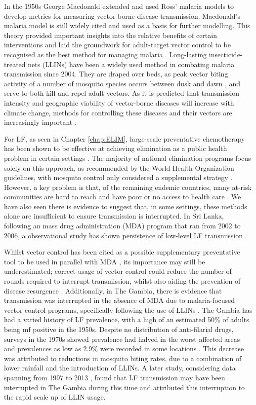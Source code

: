 In the 1950s George Macdonald extended and used Ross' malaria models to develop metrics for measuring vector-borne disease transmission. Macdonald's malaria model \cite{Macdonald1957} is still widely cited and used as a basis for further modelling. This theory provided important insights into the relative benefits of certain interventions and laid the groundwork for adult-target vector control to be recognised as the best method for managing malaria \cite{Dye1992,Morrison2008}. Long-lasting insecticide-treated nets (LLINs) have been a widely used method in combating malaria transmission since 2004. They are draped over beds, as peak vector biting activity of a number of mosquito species occurs between dusk and dawn \cite{korgaonkar2012}, and serve to both kill and repel adult vectors. As it is predicted that transmission intensity and geographic viability of vector-borne diseases will increase with climate change, methods for controlling these diseases and their vectors are increasingly important \cite{Watson2005}.

For LF, as seen in Chapter \ref{chap:ELIM}, large-scale preventative chemotherapy has been shown to be effective at achieving elimination as a public health problem in certain settings \cite{de2013,cheun2009}. The majority of national elimination programs focus solely on this approach, as recommended by the World Health Organization guidelines, with mosquito control only considered a supplemental strategy \cite{WHO2019_FactSheet}. However, a key problem is that, of the remaining endemic countries, many at-risk communities are hard to reach and have poor or no access to health care \cite{koudou2014}. We have also seen there is evidence to suggest that, in some settings, these methods alone are insufficient to ensure transmission is interrupted. In Sri Lanka, following an mass drug administration (MDA) program that ran from 2002 to 2006, a observational study has shown persistence of low-level LF transmission \cite{rao2014}.

Whilst vector control has been cited as a possible supplementary preventative tool to be used in parallel with MDA \cite{WHO2019_FactSheet}, its importance may still be underestimated; correct usage of vector control could reduce the number of rounds required to interrupt transmission, whilst also aiding the prevention of disease resurgence \cite{bockarie2009}. Additionally, in The Gambia, there is evidence that transmission was interrupted in the absence of MDA due to malaria-focused vector control programs, specifically following the use of LLINs \cite{rebollo2015}. The Gambia has had a varied history of LF prevalence, with a high of an estimated 50\% of adults being mf positive in the 1950s. Despite no distribution of anti-filarial drugs, surveys in the 1970s showed prevalence had halved in the worst affected areas and prevalences as low as 2.9\% were recorded in some locations \cite{knight1980}. This decrease was attributed to reductions in mosquito biting rates, due to a combination of lower rainfall and the introduction of LLINs. A later study, considering data spanning from 1997 to 2013 \cite{rebollo2015}, found that LF transmission may have been interrupted in The Gambia during this time and attributed this interruption to the rapid scale up of LLIN usage.

